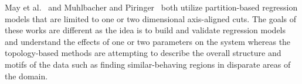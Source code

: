         
    


May et al.~\cite{May2011} and Muhlbacher and Piringer~\cite{Muhlbacher2013} both utilize partition-based regression models that are limited to one or two dimensional axis-aligned cuts.
%
The goals of these works are different as the idea is to build and validate regression models and understand the effects of one or two parameters on the system whereas the topology-based methods are attempting to describe the overall structure and motifs of the data such as finding similar-behaving regions in disparate areas of the domain.



